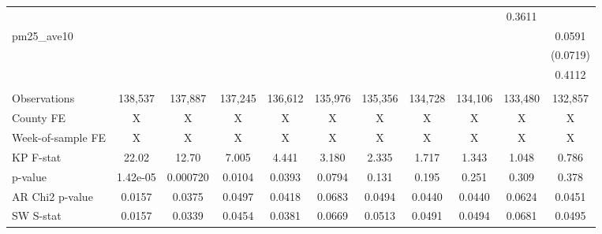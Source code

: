 \begin{tabular}{lcccccccccc}
 &  &  &  &  &  &  &  &  & 0.3611 &  \\
pm25\_ave10 &  &  &  &  &  &  &  &  &  & 0.0591 \\
 &  &  &  &  &  &  &  &  &  & (0.0719) \\
 &  &  &  &  &  &  &  &  &  & 0.4112 \\
 &  &  &  &  &  &  &  &  &  &  \\
Observations & 138,537 & 137,887 & 137,245 & 136,612 & 135,976 & 135,356 & 134,728 & 134,106 & 133,480 & 132,857 \\
County FE & X & X & X & X & X & X & X & X & X & X \\
Week-of-sample FE & X & X & X & X & X & X & X & X & X & X \\
KP F-stat & 22.02 & 12.70 & 7.005 & 4.441 & 3.180 & 2.335 & 1.717 & 1.343 & 1.048 & 0.786 \\
p-value & 1.42e-05 & 0.000720 & 0.0104 & 0.0393 & 0.0794 & 0.131 & 0.195 & 0.251 & 0.309 & 0.378 \\
AR Chi2 p-value & 0.0157 & 0.0375 & 0.0497 & 0.0418 & 0.0683 & 0.0494 & 0.0440 & 0.0440 & 0.0624 & 0.0451 \\
 SW S-stat & 0.0157 & 0.0339 & 0.0454 & 0.0381 & 0.0669 & 0.0513 & 0.0491 & 0.0494 & 0.0681 & 0.0495 \\ \hline
\end{tabular}
